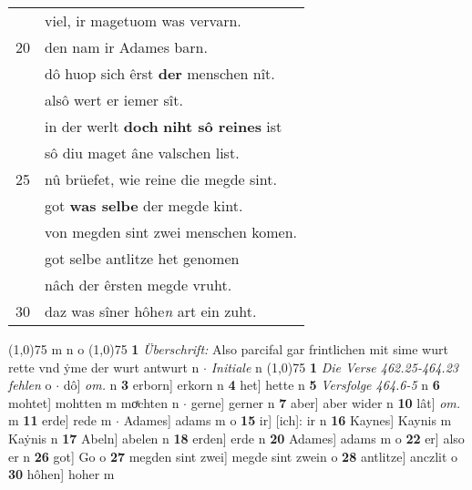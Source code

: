 \documentclass[8pt,a4paper,notitlepage]{article}
\begin{document}
\begin{table}[ht]
\begin{minipage}[t]{0.5\linewidth}
\begin{tabular}{rl}
 & viel, ir magetuom was vervarn.\\ 
20 & den nam ir Adames barn.\\ 
 & dô huop sich êrst \textbf{der} menschen nît.\\ 
 & alsô wert er iemer sît.\\ 
 & in der werlt \textbf{doch} \textbf{niht sô reines} ist\\ 
 & sô diu maget âne valschen list.\\ 
25 & nû brüefet, wie reine die megde sint.\\ 
 & got \textbf{was selbe} der megde kint.\\ 
 & von megden sint zwei menschen komen.\\ 
 & got selbe antlitze het genomen\\ 
 & nâch der êrsten megde vruht.\\ 
30 & daz was sîner hôhe\textit{n} art ein zuht.\\ 
\end{tabular}
\scriptsize
\line(1,0){75} \newline
m n o \newline
\line(1,0){75} \newline
\textbf{1} \textit{Überschrift:} Also parcifal gar frintlichen mit sime wurt rette vnd ẏme der wurt antwurt n   $\cdot$ \textit{Initiale} n  \newline
\line(1,0){75} \newline
\textbf{1} \textit{Die Verse 462.25-464.23 fehlen} o   $\cdot$ dô] \textit{om.} n \textbf{3} erborn] erkorn n \textbf{4} het] hette n \textbf{5} \textit{Versfolge 464.6-5} n  \textbf{6} mohtet] mohtten m moͯchten n  $\cdot$ gerne] gerner n \textbf{7} aber] aber wider n \textbf{10} lât] \textit{om.} m \textbf{11} erde] rede m  $\cdot$ Adames] adams m o \textbf{15} ir] [ich]: ir n \textbf{16} Kaynes] Kaynis m Kaẏnis n \textbf{17} Abeln] abelen n \textbf{18} erden] erde n \textbf{20} Adames] adams m o \textbf{22} er] also er n \textbf{26} got] Go o \textbf{27} megden sint zwei] megde sint zwein o \textbf{28} antlitze] anczlit o \textbf{30} hôhen] hoher m \newline
\end{minipage}
\end{table}
\newpage
\end{document}

